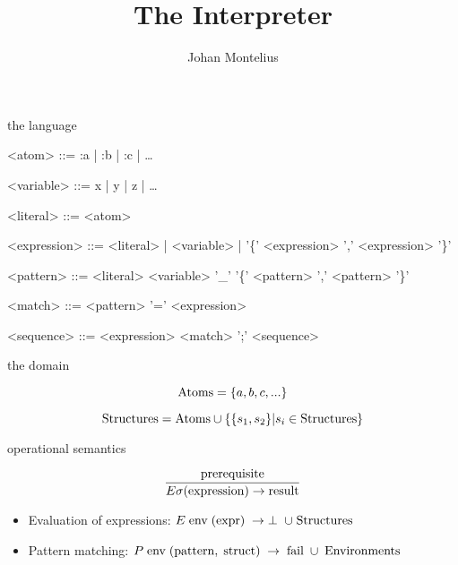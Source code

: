 

\title[ID1019 Interpreter]{The Interpreter}


\author{Johan Montelius}
\date{\semester}



\begin{frame}
\titlepage
\end{frame}


\begin{frame}{the language}
  
\begin{grammar}
<atom> ::= :a | :b | :c | \ldots

<variable> ::= x | y | z | \ldots

<literal> ::= <atom>

<expression> ::= <literal> | <variable> |  '\{' <expression> ',' <expression> '\}'

<pattern> ::= <literal> 
      \alt <variable> 
      \alt '\_' 
      \alt '\{' <pattern> ',' <pattern> '\}'

<match> ::=  <pattern> '=' <expression>

<sequence> ::=  <expression> \alt <match> ';' <sequence>
\end{grammar}

\end{frame} 

\begin{frame}{the domain}


$${\rm Atoms} =  \{a,b,c, ...\}$$

$${\rm Structures} = {\rm Atoms} \cup \{\{s_1, s_2\} | s_i \in {\rm Structures}\}$$

\end{frame}


\begin{frame}{operational semantics}

\vspace{10pt}
$$\frac{{\rm prerequisite}}{E\sigma({\rm expression}) \rightarrow {\rm result}}$$

\vspace{20pt}

\begin{itemize}
\item Evaluation of expressions: $E\; {\rm env}\; ({\rm expr}) \; \rightarrow \; \perp \; \cup \; {\rm Structures}$
\item Pattern matching: $P\; {\rm env}\; ({\rm pattern}, \; {\rm struct})\;  \rightarrow \; {\rm fail} \; \cup\;  {\rm Environments}$
\end{itemize}

\vspace{40pt}{\em This is called ``big step'' operational semantics.''}

\end{frame}


